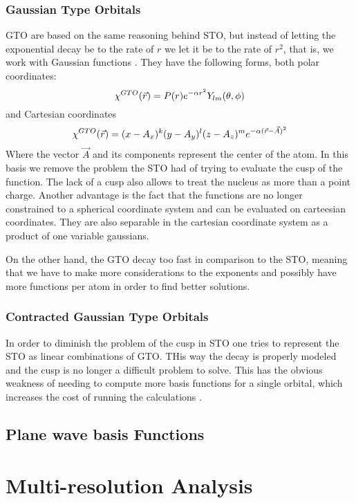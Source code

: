 \documentclass[../master_thesis.tex]{subfiles}
\begin{document}
\subsubsection{Gaussian Type Orbitals}
\ac{GTO} are based on the same reasoning behind \ac{STO}, but instead of letting
the exponential decay be to the rate of  $r$ we let it be to the rate of $r^2$,
that is, we work with Gaussian functions \cite{ESQCB1P1}.
They have the following
forms, both polar coordinates:
\begin{equation}
  \chi^{GTO}(\vec{r}) = P(r)e^{-\alpha r^2}Y_{lm}(\theta, \phi)
\end{equation}
and Cartesian coordinates
\begin{equation}
\chi^{GTO}(\vec{r}) = (x - A_x)^k(y - A_y)^l(z - A_z)^me^{-\alpha(\vec{r} - \vec{A})^2}
\end{equation}
Where the vector $\vec{A}$ and its components represent the center of the atom.
In this basis we remove the problem the \ac{STO} had of trying to evaluate the
cusp of the function. The lack of a cusp also allows to treat the nucleus as
more than a point charge. Another advantage is the fact that the functions are no
longer constrained to a spherical coordinate system and can be evaluated on carteesian
coordinates. They are also separable in the cartesian coordinate system as a product of
one variable gaussians.

On the other hand, the \ac{GTO} decay too fast in comparison to the \ac{STO},
meaning that we have to make more considerations to the exponents and possibly have more
functions per atom in order to find better solutions.
\subsubsection{Contracted Gaussian Type Orbitals}
In order to diminish the problem of the cusp in \ac{STO} one tries to represent the
\ac{STO} as linear combinations of \ac{GTO}. THis way the decay is properly modeled and the
cusp is no longer a difficult problem to solve. This has the obvious weakness of needing
to compute more basis functions for a single orbital, which increases the cost of running
the calculations \cite{Cramer:2004}. %
\subsection{Plane wave basis Functions}

\section{Multi-resolution Analysis}
\end{document}
